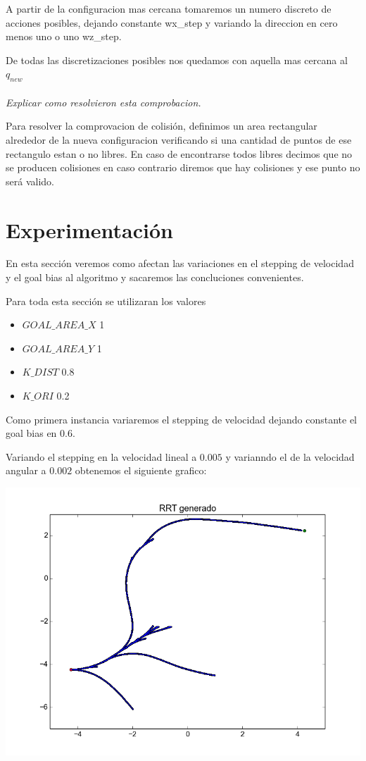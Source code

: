 A partir de la configuracion mas cercana tomaremos un numero discreto de acciones posibles, dejando constante wx\_step y variando la direccion en cero menos uno o uno wz\_step.

De todas las discretizaciones posibles nos quedamos con aquella mas cercana al $q_{new}$
\\
\\
\textit{Explicar como resolvieron esta comprobacion.}

Para resolver la comprovacion de colisión, definimos un area rectangular alrededor de la nueva configuracion verificando si una cantidad de puntos de ese rectangulo estan o no libres. En caso de encontrarse todos libres decimos que no se producen colisiones en caso contrario diremos que hay colisiones y ese punto no será valido.

\section{Experimentación}

En esta sección veremos como afectan las variaciones en el stepping de velocidad y el goal bias al algoritmo y sacaremos las concluciones convenientes.

Para toda esta sección se utilizaran los valores

\begin{itemize}
\item $GOAL\_AREA\_X$ 1
\item $GOAL\_AREA\_Y$ 1
\item $K\_DIST$ 0.8
\item $K\_ORI$ 0.2
\end{itemize}

Como primera instancia variaremos el stepping de velocidad dejando constante el goal bias en $0.6$.

Variando el stepping en la velocidad lineal a $0.005$ y varianndo el de la velocidad angular a $0.002$ obtenemos el siguiente grafico:



\includegraphics[scale=0.5]{velocidad/stepping_Bajo1.png}

